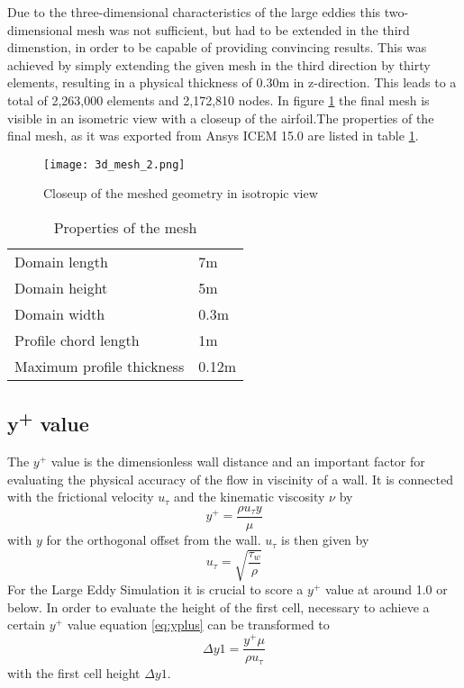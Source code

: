 Due to the three-dimensional characteristics of the large eddies this two-dimensional mesh was not sufficient, but had to be extended in the third dimenstion, in order to be capable of providing convincing results. This was achieved by simply extending the given mesh in the third direction by thirty elements, resulting in a physical thickness of 0.30m in z-direction. This leads to a total of 2,263,000 elements and 2,172,810 nodes. In figure \ref{fig:mesh_iso} the final mesh is visible in an isometric view with a closeup of the airfoil.The properties of the final mesh, as it was exported from Ansys ICEM 15.0 are listed in table \ref{tab:mesh_prop}.
\begin{figure}[ht]
\centering
\texttt{[image: 3d\_mesh\_2.png]}
\caption{Closeup of the meshed geometry in isotropic view}
\label{fig:mesh_iso}
\end{figure}
\begin{table}[ht]
\centering
\caption{Properties of the mesh}
\label{tab:mesh_prop}
\begin{tabular}{ll}
Domain length&7m\\
Domain height&5m\\
Domain width&0.3m\\
Profile chord length&1m\\
Maximum profile thickness&0.12m\\
\end{tabular}
\end{table}


\subsection{y\textsuperscript{+} value}
The $y^+$ value is the dimensionless wall distance and an important factor for evaluating the physical accuracy of the flow in viscinity of a wall. It is connected with the frictional velocity $u_{\tau}$ and the kinematic viscosity $\nu$ by
\begin{equation}
\label{eq:yplus}
y^+ = \frac{\rho u_{\tau}y}{\mu}
\end{equation}
with $y$ for the orthogonal offset from the wall. $u_{\tau}$ is then given by
\begin{equation}
u_{\tau} = \sqrt{\frac{\tau_w}{\rho}}
\end{equation}
For the Large Eddy Simulation it is crucial to score a $y^+$ value at around 1.0 or below. In order to evaluate the height of the first cell, necessary to achieve a certain $y^+$ value equation \ref{eq:yplus} can be transformed to
\begin{equation}
\Delta y1 = \frac{y^+ \mu}{\rho u_{\tau}}
\end{equation}  
with the first cell height $\Delta y1$.


